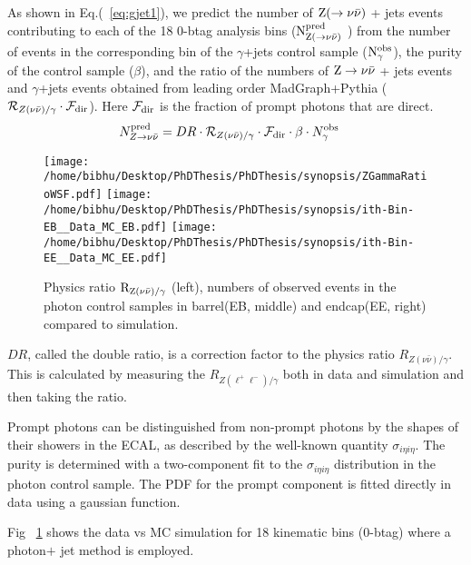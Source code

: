 As shown in Eq.(~\ref{eq:gjet1}), we predict the number of $\rm Z(\to\nu \bar{\nu})$ + jets events contributing 
to each of the 18 0-btag analysis bins ($\rm N_{Z(\to\nu \bar{\nu})}^{\rm pred}$ ) from the number of events in the corresponding 
bin of the $\gamma$+jets control sample ($\rm N_{\gamma}^{\rm obs}$), the purity of the 
control sample ($\beta$), and the ratio of the numbers of $\rm Z\to\nu \bar{\nu}$ + jets events and $\gamma$+jets events 
obtained from leading order {\sc MadGraph}+{\sc Pythia} (${\cal
  R}_{Z(\nu\bar{\nu})/\gamma} \cdot {\cal F}_{\rm dir}$).  Here ${\cal
  F}_{\rm dir}$ is the fraction of prompt photons that are direct.
\begin{align}
N_{Z\to\nu \bar{\nu}}^{\rm pred} &= DR\cdot {\cal R}_{Z(\nu\bar{\nu})/\gamma} \cdot {\cal F}_{\rm dir} \cdot \beta \cdot N_{\gamma}^{\rm obs}
\label{eq:gjet1}
\end{align}

\begin{figure}
\begin{center}
\texttt{[image: /home/bibhu/Desktop/PhDThesis/PhDThesis/synopsis/ZGammaRatioWSF.pdf]} %
\texttt{[image: /home/bibhu/Desktop/PhDThesis/PhDThesis/synopsis/ith-Bin-EB\_\_Data\_MC\_EB.pdf]} %
\texttt{[image: /home/bibhu/Desktop/PhDThesis/PhDThesis/synopsis/ith-Bin-EE\_\_Data\_MC\_EE.pdf]} %
\caption{Physics ratio $\rm R_{Z(\nu\bar{\nu})/\gamma}$ (left), numbers of observed events in the photon control samples in barrel(EB, middle) and endcap(EE, right) compared to simulation.}
\label{fig:GJdatavsmc}
\end{center}
\end{figure}
$DR$, called the double ratio, is a correction factor to the physics ratio $R_{Z(\nu\bar{\nu})/\gamma}$. This is calculated by measuring the $R_{Z(\ell^{+}{\ell^{-}})/\gamma}$ both in data and simulation and then taking the ratio.

Prompt photons can be distinguished from non-prompt photons by the shapes of their 
showers in the ECAL, as described by the well-known quantity $\sigma_{i\eta i\eta}$.  
The purity is determined with a two-component fit to the $\sigma_{i\eta i\eta}$ distribution 
in the photon control sample.  The PDF for the prompt component is fitted directly in data
using a gaussian function.

Fig ~\ref{fig:GJdatavsmc} shows the data vs MC simulation for 18 kinematic bins (0-btag) where a  photon$+$ jet method is employed. 
